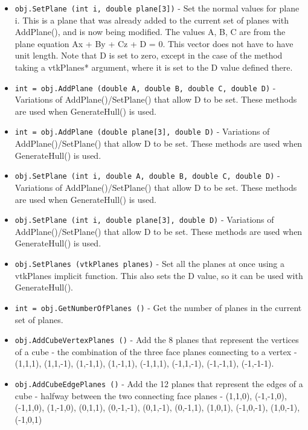 \begin{itemize}
\item  \verb|obj.SetPlane (int i, double plane[3])| -  Set the normal values for plane i. This is a plane that was already
 added to the current set of planes with AddPlane(), and is now being
 modified. The values A, B, C are from the plane equation 
 Ax + By + Cz + D = 0. This vector does not have to have unit length.
 Note that D is set to zero, except in the case of the method taking
 a vtkPlanes* argument, where it is set to the D value defined there.

\item  \verb|int = obj.AddPlane (double A, double B, double C, double D)| -  Variations of AddPlane()/SetPlane() that allow D to be set. These 
 methods are used when GenerateHull() is used.

\item  \verb|int = obj.AddPlane (double plane[3], double D)| -  Variations of AddPlane()/SetPlane() that allow D to be set. These 
 methods are used when GenerateHull() is used.

\item  \verb|obj.SetPlane (int i, double A, double B, double C, double D)| -  Variations of AddPlane()/SetPlane() that allow D to be set. These 
 methods are used when GenerateHull() is used.

\item  \verb|obj.SetPlane (int i, double plane[3], double D)| -  Variations of AddPlane()/SetPlane() that allow D to be set. These 
 methods are used when GenerateHull() is used.

\item  \verb|obj.SetPlanes (vtkPlanes planes)| -  Set all the planes at once using a vtkPlanes implicit function.
 This also sets the D value, so it can be used with GenerateHull().

\item  \verb|int = obj.GetNumberOfPlanes ()| -  Get the number of planes in the current set of planes.

\item  \verb|obj.AddCubeVertexPlanes ()| -  Add the 8 planes that represent the vertices of a cube - the combination
 of the three face planes connecting to a vertex - (1,1,1), (1,1,-1),
 (1,-1,1), (1,-1,1), (-1,1,1), (-1,1,-1), (-1,-1,1), (-1,-1-1).

\item  \verb|obj.AddCubeEdgePlanes ()| -  Add the 12 planes that represent the edges of a cube - halfway between
 the two connecting face planes - (1,1,0), (-1,-1,0), (-1,1,0), (1,-1,0),
 (0,1,1), (0,-1,-1), (0,1,-1), (0,-1,1), (1,0,1), (-1,0,-1),
 (1,0,-1), (-1,0,1)


\end{itemize}
